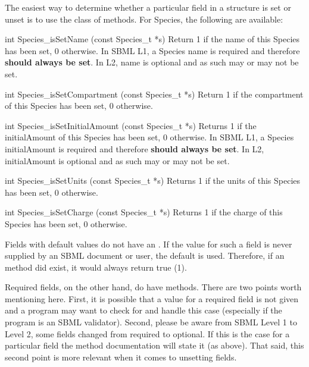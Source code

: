 \documentclass{cekmanual}
\begin{document}
The easiest way to determine whether a particular field in a structure is
set or unset is to use the  class of methods.  For
Species, the following are available:


\begin{methoddef}{int Species\_isSetName (const Species\_t *s)}
  Return 1 if the name of this Species has been set, 0 otherwise.  In
  SBML L1, a Species name is required and therefore \textbf{should
  always be set}.  In L2, name is optional and as such may or may not
  be set.
\end{methoddef}

\begin{methoddef}{int Species\_isSetCompartment (const Species\_t *s)}
  Return 1 if the compartment of this Species has been set, 0 otherwise.
\end{methoddef}

\begin{methoddef}{int Species\_isSetInitialAmount (const Species\_t *s)}
  Returns 1 if the initialAmount of this Species has been set, 0
  otherwise.  In SBML L1, a Species initialAmount is required and
  therefore \textbf{should always be set}.  In L2, initialAmount is
  optional and as such may or may not be set.
\end{methoddef}

\begin{methoddef}{int Species\_isSetUnits (const Species\_t *s)}
  Returns 1 if the units of this Species has been set, 0 otherwise.
\end{methoddef}

\begin{methoddef}{int Species\_isSetCharge (const Species\_t *s)}
  Returns 1 if the charge of this Species has been set, 0 otherwise.
\end{methoddef}


Fields with default values do not have an .  If the
value for such a field is never supplied by an SBML document or user,
the default is used. Therefore, if an  method did
exist, it would always return true (1).

Required fields, on the other hand, do have 
methods.  There are two points worth mentioning here.  First, it is
possible that a value for a required field is not given and a program
may want to check for and handle this case (especially if the program
is an SBML validator).  Second, please be aware from SBML Level 1 to
Level 2, some fields changed from required to optional.  If this is
the case for a particular field the method documentation will state it
(as above).  That said, this second point is more relevant when it
comes to unsetting fields.
\end{document}
